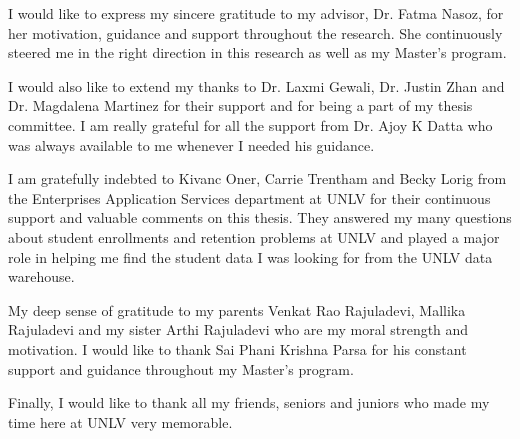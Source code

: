 \documentclass[11pt,openright]{report}
\begin{document}


\begin{thesisacknowledgments}
I would like to express my sincere gratitude to my advisor, Dr. Fatma Nasoz, for her motivation, guidance and support throughout the research. She continuously steered me in the right direction in this research as well as my Master's program.

I would also like to extend my thanks to Dr. Laxmi Gewali, Dr. Justin Zhan and Dr. Magdalena Martinez for their support and for being a part of my thesis committee. I am really grateful for all the support from Dr. Ajoy K Datta who was always available to me whenever I needed his guidance.

I am gratefully indebted to Kivanc Oner, Carrie Trentham and Becky Lorig from the Enterprises Application Services department at UNLV for their continuous support and valuable comments on this thesis. They answered my many questions about student enrollments and retention problems at UNLV and played a major role in helping me find the student data I was looking for from the UNLV data warehouse.

My deep sense of gratitude to my parents Venkat Rao Rajuladevi, Mallika Rajuladevi and my sister Arthi Rajuladevi who are my moral strength and motivation. I would like to thank Sai Phani Krishna Parsa for his constant support and guidance throughout my Master's program.

Finally, I would like to thank all my friends, seniors and juniors who made my time here at UNLV very memorable. 

\end{thesisacknowledgments}

\pagestyle{plain}

\tableofcontents
\clearpage
\listoftables
\clearpage
\listoffigures
\clearpage
\listofalgorithmes
\clearpage
\end{document}
